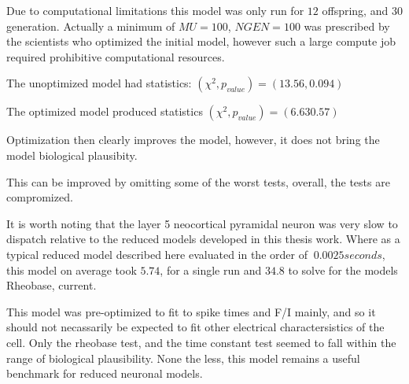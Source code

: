 Due to computational limitations this model was only run for 
$12$ offspring, and $30$ generation. Actually a minimum of $MU=100$, $NGEN =100$ was prescribed by the scientists who optimized the initial model, however such a large compute job required prohibitive computational resources.


The unoptimized model had statistics:
$(\chi^{2},p_{value})=(13.56, 0.094)$

The optimized model produced statistics
$(\chi^{2},p_{value})=(6.63 0.57)$

Optimization then clearly improves the model, however, it does not bring the model  biological plausibity.





This can be improved by omitting some of the worst tests, overall, the tests are compromized.



It is worth noting that the layer 5 neocortical pyramidal neuron was very slow to dispatch relative to the reduced models developed in this thesis work. Where as a typical reduced model described here evaluated in the order of $~0.0025 seconds$, this model on average took $5.74$, for a single run and $34.8$ to solve for the models Rheobase, current.

This model was pre-optimized to fit to spike times and F/I mainly, and so it should not necassarily be expected to fit other electrical charactersistics of the cell. Only the rheobase test, and the time constant test seemed to fall within the range of biological plausibility.
None the less, this model remains a useful benchmark for reduced neuronal models.